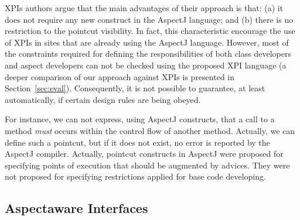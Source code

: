 XPIs authors argue that the main advantages of their approach is that:
(a) it does not require any new construct in the AspectJ language; and (b) there
is no restriction to the pointcut visibility. In fact, this characteristic
encourage the use of XPIs in sites that are already using the AspectJ language.
However, most of the constraints required for defining the responsibilities of
both class developers and aspect developers can not be checked using the proposed
XPI language (a deeper comparison of our approach against XPIs is presented in
Section~\ref{sec:eval}). Consequently, it is not possible to guarantee, at least
automatically, if certain design rules are being obeyed. 

For instance, we can not
express, using AspectJ constructs, that a call to a method \emph{must} occurs
within the control flow of another method. Actually, we can define such a
pointcut, but if it does not exist,  no error is reported by the AspectJ
compiler. Actually, pointcut constructs in AspectJ were proposed for specifying
points of execution that should be augmented by advices. They were not proposed
for specifying restrictions applied for base code developing.

\subsection{Aspectaware Interfaces}


